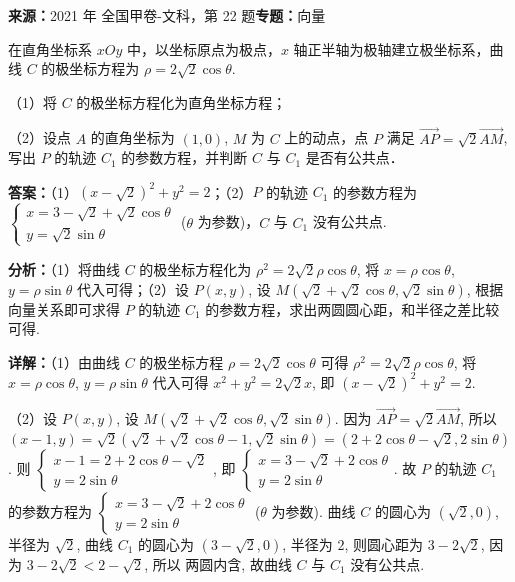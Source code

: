 \begin{question}[points=10]
\textbf{来源：}2021 年 全国甲卷-文科，第 22 题\quad \textbf{专题：}向量\par
[选修4-4：坐标系与参数方程]



在直角坐标系 $xOy$ 中，以坐标原点为极点，$x$ 轴正半轴为极轴建立极坐标系，曲线 $C$ 的极坐标方程为 $\rho = 2\sqrt{2}\cos\theta$.



（1）将 $C$ 的极坐标方程化为直角坐标方程；



（2）设点 $A$ 的直角坐标为 $(1,0)$, $M$ 为 $C$ 上的动点，点 $P$ 满足 $\overrightarrow{AP} = \sqrt{2}\overrightarrow{AM}$, 写出 $P$ 的轨迹 $C_1$ 的参数方程，并判断 $C$ 与 $C_1$ 是否有公共点．
\begin{solution}
\textbf{答案：}（1）$(x-\sqrt{2})^2 + y^2 = 2$；（2）$P$ 的轨迹 $C_1$ 的参数方程为 $\begin{cases} x = 3 - \sqrt{2} + \sqrt{2}\cos\theta \\ y = \sqrt{2}\sin\theta \end{cases}$ ($\theta$ 为参数)，$C$ 与 $C_1$ 没有公共点.

\textbf{分析：}（1）将曲线 $C$ 的极坐标方程化为 $\rho^2 = 2\sqrt{2}\rho\cos\theta$, 将 $x=\rho\cos\theta$, $y=\rho\sin\theta$ 代入可得；（2）设 $P(x,y)$, 设 $M(\sqrt{2}+\sqrt{2}\cos\theta, \sqrt{2}\sin\theta)$, 根据向量关系即可求得 $P$ 的轨迹 $C_1$ 的参数方程，求出两圆圆心距，和半径之差比较可得.

\textbf{详解：}（1）由曲线 $C$ 的极坐标方程 $\rho = 2\sqrt{2}\cos\theta$ 可得 $\rho^2 = 2\sqrt{2}\rho\cos\theta$, 将 $x=\rho\cos\theta$, $y=\rho\sin\theta$ 代入可得 $x^2+y^2 = 2\sqrt{2}x$, 即 $(x-\sqrt{2})^2 + y^2 = 2$.

（2）设 $P(x,y)$, 设 $M(\sqrt{2}+\sqrt{2}\cos\theta, \sqrt{2}\sin\theta)$. 因为 $\overrightarrow{AP} = \sqrt{2}\overrightarrow{AM}$, 所以 $(x-1, y) = \sqrt{2}(\sqrt{2}+\sqrt{2}\cos\theta - 1, \sqrt{2}\sin\theta) = (2+2\cos\theta - \sqrt{2}, 2\sin\theta)$. 则 $\begin{cases} x-1 = 2+2\cos\theta - \sqrt{2} \\ y = 2\sin\theta \end{cases}$, 即 $\begin{cases} x = 3 - \sqrt{2} + 2\cos\theta \\ y = 2\sin\theta \end{cases}$. 故 $P$ 的轨迹 $C_1$ 的参数方程为 $\begin{cases} x = 3 - \sqrt{2} + 2\cos\theta \\ y = 2\sin\theta \end{cases}$ ($\theta$ 为参数). 曲线 $C$ 的圆心为 $(\sqrt{2},0)$, 半径为 $\sqrt{2}$, 曲线 $C_1$ 的圆心为 $(3-\sqrt{2},0)$, 半径为 $2$, 则圆心距为 $3-2\sqrt{2}$, 因为 $3-2\sqrt{2} < 2 - \sqrt{2}$, 所以 两圆内含, 故曲线 $C$ 与 $C_1$ 没有公共点.
\end{solution}
\end{question}

